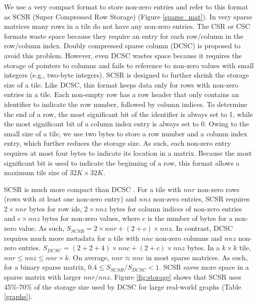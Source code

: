 
We use a very compact format to store non-zero entries and refer to this
format as SCSR (Super Compressed Row Storage) (Figure \ref{sparse_mat}).
In very sparse matrices many rows in a tile
do not have any non-zero entries. The CSR or CSC formats waste space because
they require an entry for each row/column in the row/column index. Doubly
compressed sparse column (DCSC) \cite{Buluc08} is proposed to avoid this problem.
However, even DCSC wastes space because it requires the storage of
pointers to columns and fails to reference to non-zero values with small
integers (e.g., two-byte integers). SCSR is designed to further shrink the storage
size of a tile.
Like DCSC, this format keeps data only for rows with non-zero entries in a tile.
Each non-empty row has a row header that only contains an identifier
to indicate the row number, followed by column indices. To determine the end
of a row, the most significant bit of the identifier is always set to 1, while
the most significant bit of a column index entry is always set to 0.
Owing to the small size of a tile, we use two bytes to store a row
number and a column index entry, which further reduces the storage size. As such,
each non-zero entry requires at most four bytes to indicate its location in
a matrix. Because the most significant bit is used to indicate the beginning
of a row, this format allows a maximum tile size of $32K \times 32K$.

SCSR is much more compact than DCSC \cite{Buluc08}. For a tile with $nnr$
non-zero rows (rows with at least one non-zero entry) and $nnz$ non-zero entries,
SCSR requires $2 \times nnr$ bytes for row ids, $2 \times nnz$ bytes for column
indices of non-zero entries and $c \times nnz$ bytes for non-zero values, where
$c$ is the number of
bytes for a non-zero value. As such, $S_{SCSR} = 2 \times nnr + (2 + c) \times nnz$.
In contrast, DCSC requires much more metadata for a tile
with $nnc$ non-zero columns and $nnz$ non-zero entries.
$S_{DCSC} = (2 + 2 + 4) \times nnc + (2 + c) \times nnz$ bytes. In a $k \times k$
tile, $nnr \le nnz \le nnr \times k$. On average, $nnr \approx nnc$ in most sparse
matrices. As such, for a binary sparse matrix, $0.4 \le S_{SCSR} / S_{DCSC} < 1$.
SCSR saves more space in a sparse matrix with larger $nnr / nnz$. Figure
\ref{fig:storage} shows that SCSR uses 45\%-70\% of the storage size used by DCSC
for large real-world graphs (Table \ref{graphs}).

